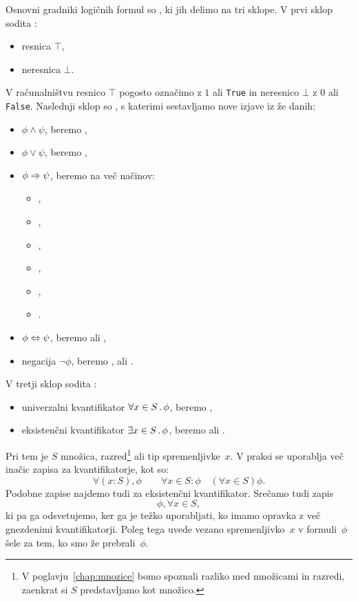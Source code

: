 Osnovni gradniki logičnih formul so , ki jih delimo na tri sklope.
V prvi sklop sodita :
%
\begin{itemize}
\item resnica $\top$,
\item neresnica $\bot$.
\end{itemize}
%
V računalništvu resnico $\top$ pogosto označimo z $1$ ali \texttt{True} in
neresnico $\bot$ z $0$ ali \texttt{False}. Naslednji sklop so , s katerimi sestavljamo nove izjave iz že danih:
%
\begin{itemize}
\item {} $\phi \land \psi$, beremo ,
\item {} $\phi \lor \psi$, beremo ,
\item {} $\phi \Rightarrow \psi$, beremo na več načinov:
  \begin{itemize}
  \item {},
  \item {},
  \item {},
  \item {},
  \item {},
  \item {}.
  \end{itemize}
\item {} $\phi \Leftrightarrow \psi$, beremo  ali ,
\item negacija $\lnot \phi$, beremo ,  ali .
\end{itemize}
%
V tretji sklop sodita :
%
\begin{itemize}
\item univerzalni kvantifikator $\forall x \in S \,.\, \phi$, beremo ,
\item eksistenčni kvantifikator $\exists x \in S \,.\, \phi$, beremo  ali .
\end{itemize}
%
Pri tem je $S$ množica, razred\footnote{V poglavju~\ref{chap:mnozice}
  bomo spoznali razliko med množicami in razredi, zaenkrat si $S$
  predstavljamo kot množico.} ali tip spremenljivke~$x$. V praksi se
uporablja več inačic zapisa za kvantifikatorje, kot so:
%
\begin{equation*}
  \forall (x : S) , \phi
  \qquad
  \forall x \in S : \phi
  \quad
  (\forall x \in S) \phi.
\end{equation*}
%
Podobne zapise najdemo tudi za eksistenčni kvantifikator.
%
Srečamo tudi zapis
%
\begin{equation*}
  \phi, \forall x \in S,
\end{equation*}
%
ki pa ga odsvetujemo, ker ga je težko uporabljati, ko imamo opravka z več gnezdenimi kvantifikatorji.
%
Poleg tega uvede vezano spremenljivko~$x$ v formuli~$\phi$ šele za tem, ko smo že prebrali~$\phi$.

